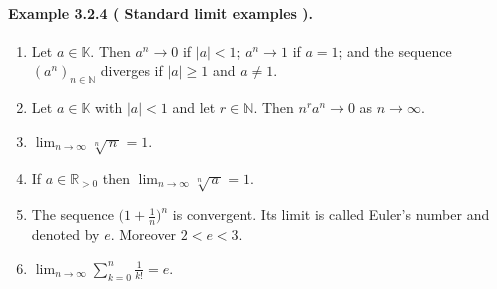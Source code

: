 \documentclass[12pt,a4paper]{article}
\newcommand{\N}{\mathbb{N}}
\newcommand{\R}{\mathbb{R}}
\newcommand{\K}{\mathbb{K}} %
\newcommand{\NumberedExample}[3]{%
\paragraph*{Example #1 ( #2 ).} #3\par}
\theoremstyle{plain}
\theoremstyle{definition}
\theoremstyle{remark}
\begin{document}
\NumberedExample{3.2.4}{Standard limit examples}{
\begin{enumerate}[label={(\arabic*)}, leftmargin=*]
	\item Let $a\in\K$. Then $a^n\to 0$ if $|a|<1$; $a^n\to 1$ if $a=1$; and the sequence $(a^n)_{n\in\N}$ diverges if $|a|\ge 1$ and $a\ne 1$.

	\item Let $a\in\K$ with $|a|<1$ and let $r\in\N$. Then $n^{r} a^{n}\to 0$ as $n\to\infty$.

	\item $\displaystyle \lim_{n\to\infty} \sqrt[n]{\,n\,} = 1$.

	\item If $a\in\R_{>0}$ then $\displaystyle \lim_{n\to\infty} \sqrt[n]{\,a\,} = 1$.

	\item The sequence $\bigl(1+\tfrac{1}{n}\bigr)^{\!n}$ is convergent. Its limit is called Euler's number and denoted by $e$. Moreover $2<e<3$.

	\item $\displaystyle \lim_{n\to\infty} \sum_{k=0}^{n} \frac{1}{k!} = e$.
\end{enumerate}}
\end{document}
